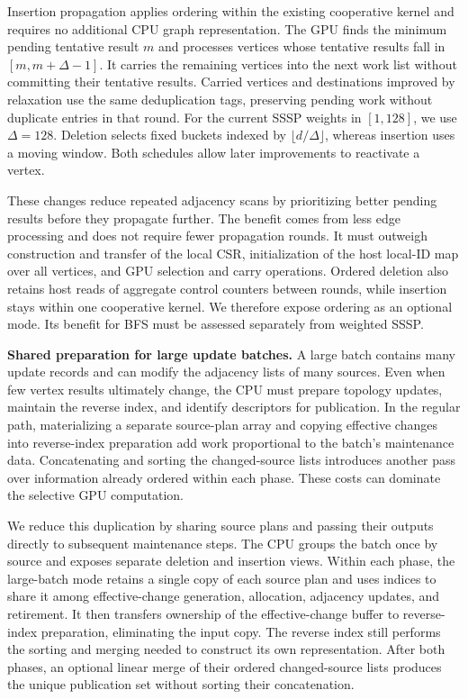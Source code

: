 Insertion propagation applies ordering within the existing cooperative kernel and requires no additional CPU graph representation. The GPU finds the minimum pending tentative result $m$ and processes vertices whose tentative results fall in $[m,m+\Delta-1]$. It carries the remaining vertices into the next work list without committing their tentative results. Carried vertices and destinations improved by relaxation use the same deduplication tags, preserving pending work without duplicate entries in that round. For the current SSSP weights in $[1,128]$, we use $\Delta=128$. Deletion selects fixed buckets indexed by $\lfloor d/\Delta\rfloor$, whereas insertion uses a moving window. Both schedules allow later improvements to reactivate a vertex.

These changes reduce repeated adjacency scans by prioritizing better pending results before they propagate further. The benefit comes from less edge processing and does not require fewer propagation rounds. It must outweigh construction and transfer of the local CSR, initialization of the host local-ID map over all vertices, and GPU selection and carry operations. Ordered deletion also retains host reads of aggregate control counters between rounds, while insertion stays within one cooperative kernel. We therefore expose ordering as an optional mode. Its benefit for BFS must be assessed separately from weighted SSSP.

\textbf{Shared preparation for large update batches.} A large batch contains many update records and can modify the adjacency lists of many sources. Even when few vertex results ultimately change, the CPU must prepare topology updates, maintain the reverse index, and identify descriptors for publication. In the regular path, materializing a separate source-plan array and copying effective changes into reverse-index preparation add work proportional to the batch's maintenance data. Concatenating and sorting the changed-source lists introduces another pass over information already ordered within each phase. These costs can dominate the selective GPU computation.

We reduce this duplication by sharing source plans and passing their outputs directly to subsequent maintenance steps. The CPU groups the batch once by source and exposes separate deletion and insertion views. Within each phase, the large-batch mode retains a single copy of each source plan and uses indices to share it among effective-change generation, allocation, adjacency updates, and retirement. It then transfers ownership of the effective-change buffer to reverse-index preparation, eliminating the input copy. The reverse index still performs the sorting and merging needed to construct its own representation. After both phases, an optional linear merge of their ordered changed-source lists produces the unique publication set without sorting their concatenation.

